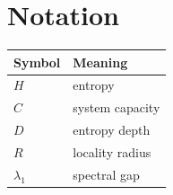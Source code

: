 \chapter{Notation}

\begin{tabular}{ll}
Symbol & Meaning \\
\midrule
\(H\) & entropy \\
\(C\) & system capacity \\
\(D\) & entropy depth \\
\(R\) & locality radius \\
\(\lambda_1\) & spectral gap \\
\end{tabular}
